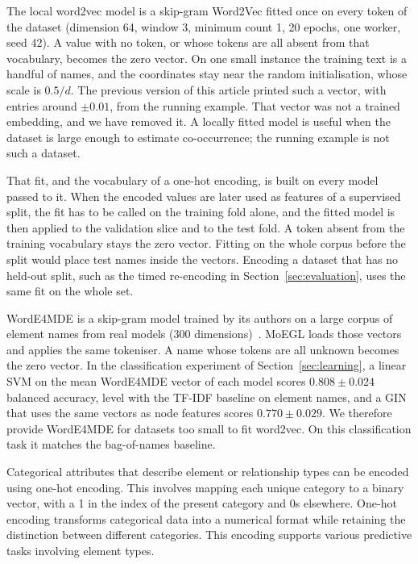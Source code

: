 \documentclass[journal,article,submit,moreauthors,technologies]{Definitions/mdpi}
\newcommand{\rev}[1]{#1}
\begin{document}
\rev{The local word2vec model is a skip-gram Word2Vec fitted once on every token of the dataset (dimension 64, window 3, minimum count 1, 20 epochs, one worker, seed 42). A value with no token, or whose tokens are all absent from that vocabulary, becomes the zero vector. On one small instance the training text is a handful of names, and the coordinates stay near the random initialisation, whose scale is \(0.5/d\). The previous version of this article printed such a vector, with entries around \(\pm 0.01\), from the running example. That vector was not a trained embedding, and we have removed it. A locally fitted model is useful when the dataset is large enough to estimate co-occurrence; the running example is not such a dataset.}

\rev{That fit, and the vocabulary of a one-hot encoding, is built on every model passed to it. When the encoded values are later used as features of a supervised split, the fit has to be called on the training fold alone, and the fitted model is then applied to the validation slice and to the test fold. A token absent from the training vocabulary stays the zero vector. Fitting on the whole corpus before the split would place test names inside the vectors. Encoding a dataset that has no held-out split, such as the timed re-encoding in Section~\ref{sec:evaluation}, uses the same fit on the whole set.}

\rev{WordE4MDE is a skip-gram model trained by its authors on a large corpus of element names from real models (300 dimensions)~\cite{lopez2023word}. MoEGL loads those vectors and applies the same tokeniser. A name whose tokens are all unknown becomes the zero vector. In the classification experiment of Section~\ref{sec:learning}, a linear SVM on the mean WordE4MDE vector of each model scores \(0.808\pm0.024\) balanced accuracy, level with the TF-IDF baseline on element names, and a GIN that uses the same vectors as node features scores \(0.770\pm0.029\). We therefore provide WordE4MDE for datasets too small to fit word2vec. On this classification task it matches the bag-of-names baseline.}

Categorical attributes that describe element or relationship types can be encoded using one-hot encoding. This involves mapping each unique category to a binary vector, with a 1 in the index of the present category and 0s elsewhere. One-hot encoding transforms categorical data into a numerical format while retaining the distinction between different categories. This encoding supports various predictive tasks involving element types.
\end{document}
